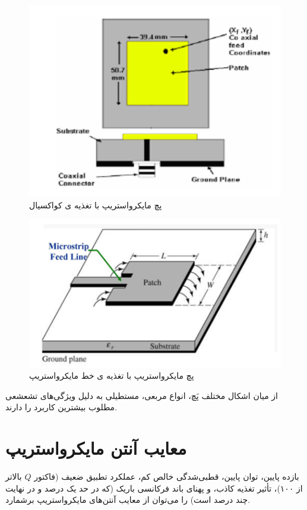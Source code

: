 \begin{figure}
\centering
\includegraphics[scale=0.3]{Images/fig1.png}
\caption{پچ مایکرواستریپ با تغذیه ی کواکسیال}
\label{fig1}
\end{figure}
\begin{figure}
	\centering
	\includegraphics[scale=0.3]{Images/fig2.png}
	\caption{پچ مایکرواستریپ با تغذیه ی خط مایکرواستریپ}
	\label{fig2}
\end{figure}


از میان اشکال مختلف پَچ، انواع مربعی، مستطیلی به دلیل ویژگی‌های تشعشعی مطلوب بیشترین کاربرد را دارند.

\section{معایب آنتن مایکرواستریپ}
بازده پایین، توان پایین، قطبی‌شدگی خالص کم، عملکرد تطبیق ضعیف (فاکتور
$Q$
 بالاتر از ۱۰۰)، تأثیر تغذیه کاذب، و پهنای باند فرکانسی باریک (که در حد یک درصد و در نهایت چند درصد است) را می‌توان از معایب آنتن‌های مایکرواستریپ برشمارد.

